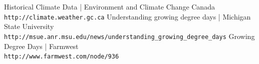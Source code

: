 \documentclass[12pt]{article}
\begin{document}

\clearpage




\begin{thebibliography}{2}
Historical Climate Data | Environment and Climate Change Canada
\\\texttt{http://climate.weather.gc.ca}
Understanding growing degree days | Michigan State University
\\\texttt{http://msue.anr.msu.edu/news/understanding\_growing\_degree\_days}
Growing Degree Days | Farmwest
\\\texttt{http://www.farmwest.com/node/936}
\end{thebibliography}
\end{document}

